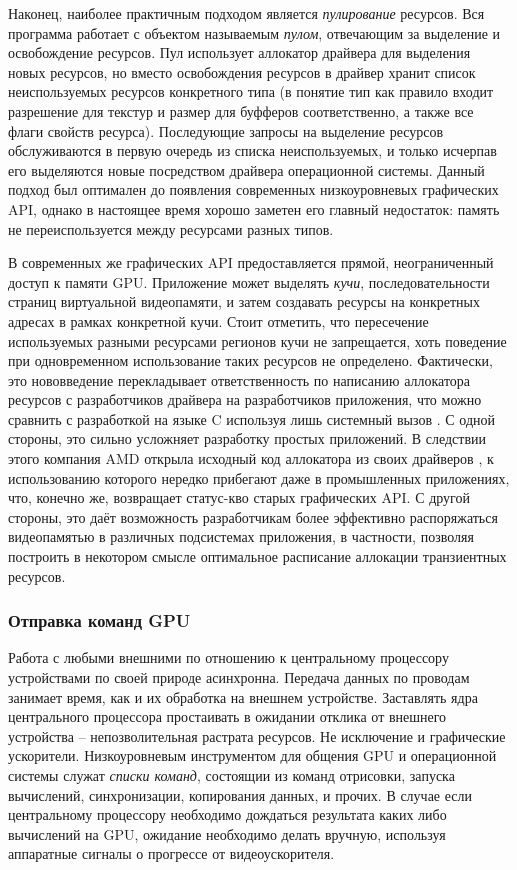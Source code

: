 Наконец, наиболее практичным подходом является \textit{пулирование} ресурсов.
Вся программа работает с объектом называемым \textit{пулом}, отвечающим за выделение и освобождение ресурсов.
Пул использует аллокатор драйвера для выделения новых ресурсов, но вместо освобождения ресурсов в драйвер хранит список неиспользуемых ресурсов конкретного типа (в понятие тип как правило входит разрешение для текстур и размер для буфферов соответственно, а также все флаги свойств ресурса).
Последующие запросы на выделение ресурсов обслуживаются в первую очередь из списка неиспользуемых, и только исчерпав его выделяются новые посредством драйвера операционной системы.
Данный подход был оптимален до появления современных низкоуровневых графических API, однако в настоящее время хорошо заметен его главный недостаток: память не переиспользуется между ресурсами разных типов.

В современных же графических API предоставляется прямой, неограниченный доступ к памяти GPU.
Приложение может выделять \textit{кучи}, последовательности страниц виртуальной видеопамяти, и затем создавать ресурсы на конкретных адресах в рамках конкретной кучи.
Стоит отметить, что пересечение используемых разными ресурсами регионов кучи не запрещается, хоть поведение при одновременном использование таких ресурсов не определено.
Фактически, это нововведение перекладывает ответственность по написанию аллокатора ресурсов с разработчиков драйвера на разработчиков приложения, что можно сравнить с разработкой на языке C используя лишь системный вызов .
С одной стороны, это сильно усложняет разработку простых приложений.
В следствии этого компания AMD открыла исходный код аллокатора из своих драйверов , к использованию которого нередко прибегают даже в промышленных приложениях, что, конечно же, возвращает статус-кво старых графических API.
С другой стороны, это даёт возможность разработчикам более эффективно распоряжаться видеопамятью в различных подсистемах приложения, в частности, позволяя построить в некотором смысле оптимальное расписание аллокации транзиентных ресурсов.

\subsubsection{Отправка команд GPU}
Работа с любыми внешними по отношению к центральному процессору устройствами по своей природе асинхронна.
Передача данных по проводам занимает время, как и их обработка на внешнем устройстве.
Заставлять ядра центрального процессора простаивать в ожидании отклика от внешнего устройства -- непозволительная растрата ресурсов.
Не исключение и графические ускорители.
Низкоуровневым инструментом для общения GPU и операционной системы служат \textit{списки команд}, состоящии из команд отрисовки, запуска вычислений, синхронизации, копирования данных, и прочих.
В случае если центральному процессору необходимо дождаться результата каких либо вычислений на GPU, ожидание необходимо делать вручную, используя аппаратные сигналы о прогрессе от видеоускорителя.

